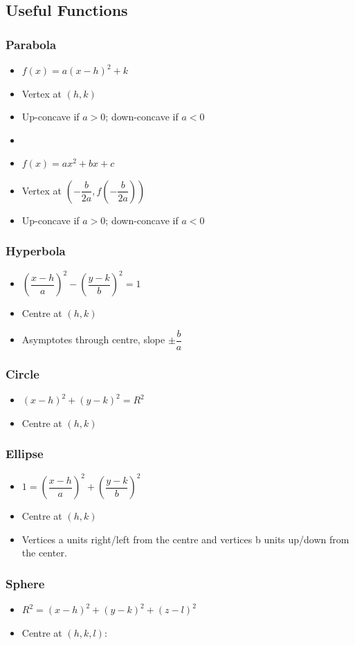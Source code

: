 \documentclass[]{report}
\newcommand \tab[1][1cm]{\hspace*{#1}}
\newcommand{\itemt}{\item \tab}
\begin{document}
		
        \subsection{Useful Functions}
        
\subsubsection{Parabola}
\begin{itemize}
\itemt \( f(x) = a(x-h)^2 + k \)
\itemt Vertex at \( (h,k) \)
\itemt Up-concave if $a>0$; down-concave if $a<0$
\item[]
\itemt \( f(x) = ax^2 + bx + c \)
\itemt Vertex at \( (-\dfrac{b}{2a}, f(-\dfrac{b}{2a})) \)
\itemt Up-concave if $a>0$; down-concave if $a<0$
\end{itemize}

\subsubsection{Hyperbola}
\begin{itemize}
\itemt \( (\dfrac{x-h}{a})^2 - (\dfrac{y-k}{b})^2 = 1\)
\itemt Centre at $(h,k)$
\itemt Asymptotes through centre, slope $\pm\dfrac{b}{a}$
\end{itemize}

\subsubsection{Circle}
\begin{itemize}
\itemt \( (x-h)^2 + (y-k)^2 = R^2\)
\itemt Centre at $(h,k)$
\end{itemize}

\subsubsection{Ellipse}
\begin{itemize}
\itemt \(1 = (\dfrac{x-h}{a})^2 + (\dfrac{y-k}{b})^2\)
\itemt Centre at $(h,k)$
\itemt Vertices a units right/left from the centre and vertices b units up/down from the center.
\end{itemize}	

\subsubsection{Sphere}
\begin{itemize}
\itemt \(R^2 = (x-h)^2 + (y-k)^2 + (z-l)^2\)    
\itemt Centre at $(h,k,l)$:
\end{itemize}
\end{document}
